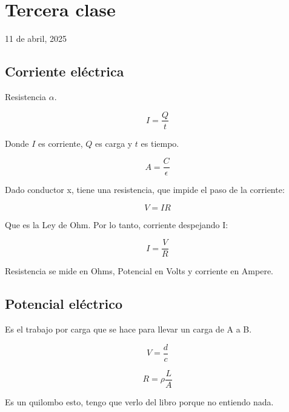 \section{Tercera clase}

11 de abril, 2025

\subsection{Corriente eléctrica}

Resistencia \(\alpha\).

\begin{equation*}
    I = \frac{Q}{t}
\end{equation*}

Donde \(I\) es corriente,
\(Q\) es carga
y \(t\) es tiempo.

\begin{equation*}
    A = \frac{C}{\epsilon}
\end{equation*}

Dado conductor x,
tiene una resistencia,
que impide el paso de la corriente:

\begin{equation*}
    V = IR
\end{equation*}

Que es la Ley de Ohm.
Por lo tanto, corriente despejando I:

\begin{equation*}
    I = \frac{V}{R}
\end{equation*}

Resistencia se mide en Ohms,
Potencial en Volts
y corriente en Ampere.

\subsection{Potencial eléctrico}

Es el trabajo por carga que se hace para llevar un carga de A a B.

\begin{equation*}
    V = \frac{d}{c}
\end{equation*}

\begin{equation*}
    R = \rho\frac{L}{A}
\end{equation*}

Es un quilombo esto, tengo que verlo del libro porque no entiendo nada.